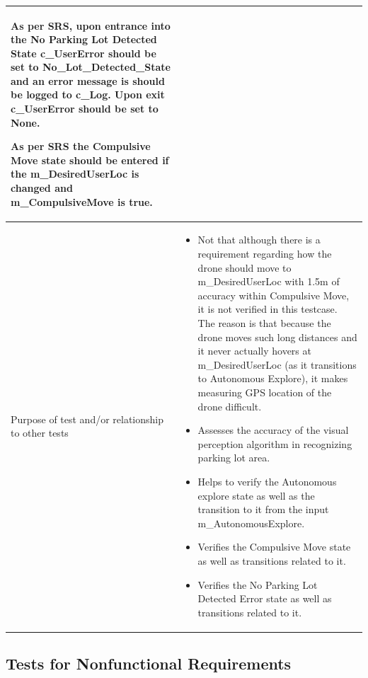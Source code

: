 \documentclass[12pt, titlepage]{article}
\begin{document}
\begin{table}[!h]
\begin{center}
\begin{tabular}{ | m{1.5cm} | m{15cm} | }
As per SRS, upon entrance into the No Parking Lot Detected State c_UserError should be set to No_Lot_Detected_State and an error message is should be logged to c_Log. Upon exit c_UserError should be set to None.

As per SRS the Compulsive Move state should be entered if the m_DesiredUserLoc is changed and m_CompulsiveMove is true. 
 \\ 
\hline
Purpose of test and/or relationship to other tests & 
\begin{itemize}
    \item Not that although there is a requirement regarding how the drone should move to m_DesiredUserLoc with 1.5m of accuracy within Compulsive Move, it is not verified in this testcase. The reason is that because the drone moves such long distances and it never actually hovers at m_DesiredUserLoc (as it transitions to Autonomous Explore), it makes measuring GPS location of the drone difficult.
    \item Assesses the accuracy of the visual perception algorithm in recognizing parking lot area. 
    \item Helps to verify the Autonomous explore state as well as the transition to it from the input m_AutonomousExplore. 
    \item Verifies the Compulsive Move state as well as transitions related to it.
    \item Verifies the No Parking Lot Detected Error state as well as transitions related to it.
\end{itemize}
\\ 
\hline
\end{tabular}
\end{center}
\end{table}
\subsection{Tests for Nonfunctional Requirements}



\end{document}

